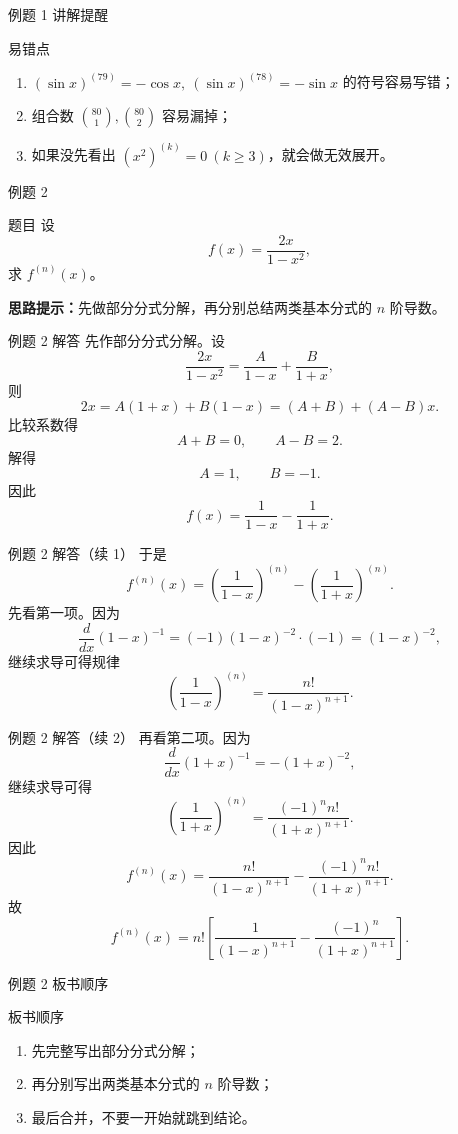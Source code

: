 ﻿\documentclass[aspectratio=169,10pt]{ctexbeamer}
\begin{document}
\begin{frame}[t]{例题 1 讲解提醒}
\small
\begin{block}{易错点}
\begin{enumerate}
  \item $(\sin x)^{(79)}=-\cos x,\ (\sin x)^{(78)}=-\sin x$ 的符号容易写错；
  \item 组合数 $\binom{80}{1},\binom{80}{2}$ 容易漏掉；
  \item 如果没先看出 $(x^2)^{(k)}=0\ (k\ge3)$，就会做无效展开。
\end{enumerate}
\end{block}
\end{frame}

\begin{frame}[t]{例题 2}
\small
\begin{block}{题目}
设
\[
f(x)=\frac{2x}{1-x^2},
\]
求 $f^{(n)}(x)$。
\end{block}

\vspace{0.4em}
\textbf{思路提示：}先做部分分式分解，再分别总结两类基本分式的 $n$ 阶导数。
\end{frame}

\begin{frame}[t]{例题 2 解答}
\small
先作部分分式分解。设
\[
\frac{2x}{1-x^2}=\frac{A}{1-x}+\frac{B}{1+x},
\]
则
\[
2x=A(1+x)+B(1-x)=(A+B)+(A-B)x.
\]
比较系数得
\[
A+B=0,\qquad A-B=2.
\]
解得
\[
A=1,\qquad B=-1.
\]
因此
\[
f(x)=\frac{1}{1-x}-\frac{1}{1+x}.
\]
\end{frame}

\begin{frame}[t]{例题 2 解答（续 1）}
\small
于是
\[
f^{(n)}(x)=\left(\frac{1}{1-x}\right)^{(n)}-\left(\frac{1}{1+x}\right)^{(n)}.
\]
先看第一项。因为
\[
\frac{d}{dx}(1-x)^{-1}=(-1)(1-x)^{-2}\cdot(-1)=(1-x)^{-2},
\]
继续求导可得规律
\[
\left(\frac{1}{1-x}\right)^{(n)}=\frac{n!}{(1-x)^{n+1}}.
\]
\end{frame}

\begin{frame}[t]{例题 2 解答（续 2）}
\small
再看第二项。因为
\[
\frac{d}{dx}(1+x)^{-1}=-(1+x)^{-2},
\]
继续求导可得
\[
\left(\frac{1}{1+x}\right)^{(n)}=\frac{(-1)^n n!}{(1+x)^{n+1}}.
\]
因此
\[
f^{(n)}(x)
=\frac{n!}{(1-x)^{n+1}}-\frac{(-1)^n n!}{(1+x)^{n+1}}.
\]
故
\[
\boxed{
f^{(n)}(x)=
n!\left[\frac{1}{(1-x)^{n+1}}-\frac{(-1)^n}{(1+x)^{n+1}}\right].
}
\]
\end{frame}

\begin{frame}[t]{例题 2 板书顺序}
\small
\begin{block}{板书顺序}
\begin{enumerate}
  \item 先完整写出部分分式分解；
  \item 再分别写出两类基本分式的 $n$ 阶导数；
  \item 最后合并，不要一开始就跳到结论。
\end{enumerate}
\end{block}
\end{frame}
\end{document}
